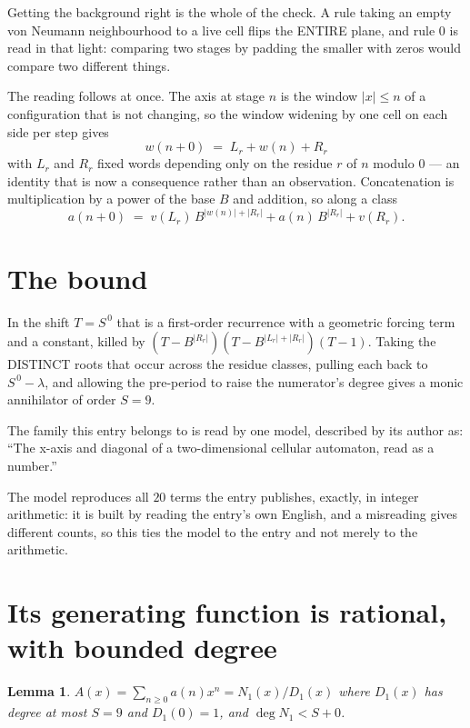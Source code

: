 \documentclass[11pt,a4paper]{article}
\theoremstyle{plain}
\newtheorem{lemma}[theorem]{Lemma}
\theoremstyle{definition}
\begin{document}
Getting the background right is the whole of the check. A rule taking an empty von Neumann
neighbourhood to a live cell flips the ENTIRE plane, and rule 0 is read
in that light: comparing two stages by padding the smaller with zeros would compare two
different things.

The reading follows at once. The axis at stage $n$ is the window $|x|\le n$ of a configuration
that is not changing, so the window widening by one cell on each side per step gives
\[
w(n+0)\;=\;L_r + w(n) + R_r
\]
with $L_r$ and $R_r$ fixed words depending only on the residue $r$ of $n$ modulo $0$ --- an
identity that is now a consequence rather than an observation. Concatenation is multiplication
by a power of the base $B$ and addition, so along a class
\[
a(n+0)\;=\;v(L_r)\,B^{|w(n)|+|R_r|} + a(n)\,B^{|R_r|} + v(R_r).
\]

\section{The bound}

In the shift $T=S^{\,0}$ that is a first-order recurrence with a geometric forcing term and a
constant, killed by $(T-B^{|R_r|})(T-B^{|L_r|+|R_r|})(T-1)$. Taking the DISTINCT roots that
occur across the residue classes, pulling each back to $S^{\,0}-\lambda$, and allowing the
pre-period to raise the numerator's degree gives a monic annihilator of order $S=9$.

The family this entry belongs to is read by one model, described by its author as: ``The x-axis and diagonal of a two-dimensional cellular automaton, read as a number.''


The model reproduces all $20$ terms the entry publishes, exactly, in integer arithmetic:
it is built by reading the entry's own English, and a misreading gives different counts, so
this ties the model to the entry and not merely to the arithmetic.

\section{Its generating function is rational, with bounded degree}

\begin{lemma}\label{lem:rat}
$A(x)=\sum_{n\ge0}a(n)x^n=N_1(x)/D_1(x)$ where $D_1(x)$ has degree at most $S=9$ and
$D_1(0)=1$, and $\deg N_1<S+0$.
\end{lemma}
\end{document}
